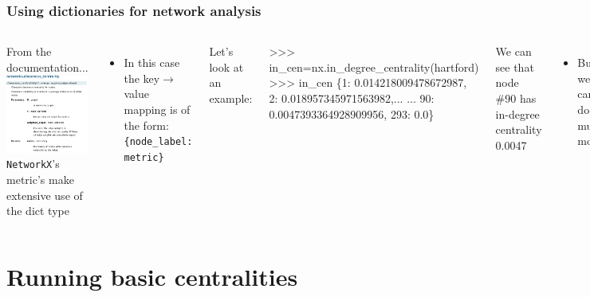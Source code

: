 \documentclass[xcolor=dvipsnames, 9pt]{beamer}
\begin{document}
\begin{frame}[fragile]
    \frametitle{Using dictionaries for network analysis}
    \begin{columns}
        From the documentation...\\ \vspace{3mm}
        \includegraphics[width=5cm]{../images/figures/closeness_doc.png}
        \texttt{NetworkX}'s metric's make extensive use of the dict type
        \begin{itemize}
            \item In this case the key$\rightarrow$value mapping is of the form: \texttt{\{node\_label: metric\}} 
        \end{itemize}
        Let's look at an example:
        \begin{block}{}
            \begin{code}
\scriptsize{>>> in_cen=nx.in_degree_centrality(hartford)
>>> in_cen
\{1: 0.014218009478672987, 2: 0.018957345971563982,...
...
90: 0.0047393364928909956, 293: 0.0\}}
            \end{code}
        \end{block}
        We can see that node \#90 has in-degree centrality 0.0047
        \begin{itemize}
            \item But we can do so much more!
        \end{itemize}
    \end{columns}
\end{frame}



\section{Running basic centralities} %
\label{sec:running_basic_centralities}
\end{document}
